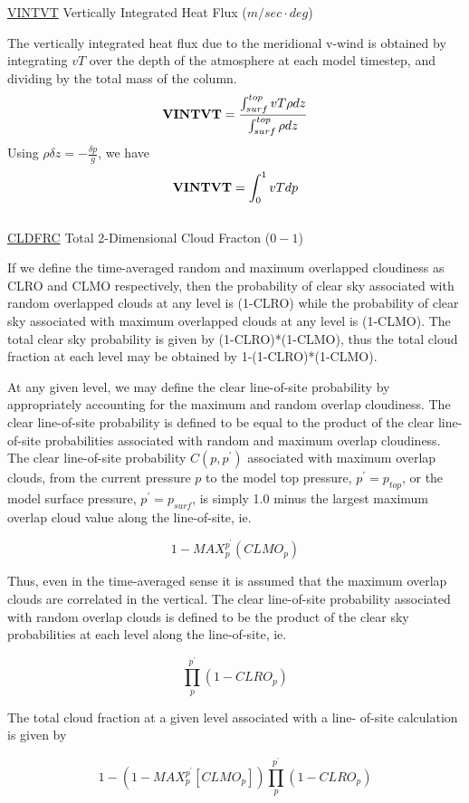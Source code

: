 \noindent
{ \underline {VINTVT} Vertically Integrated Heat Flux ($m/sec \cdot deg$) }

\noindent
The vertically integrated heat flux due to the meridional v-wind is obtained by integrating
$v T$ over the depth of the atmosphere at each model timestep, 
and dividing by the total mass of the column.
\[
{\bf VINTVT} = \frac{ \int_{surf}^{top} v T \rho dz  } { \int_{surf}^{top} \rho dz  }
\]
Using $\rho \delta z = -\frac{\delta p}{g} $, we have 
\[
{\bf VINTVT} = { \int_0^1 v T dp  }
\]
\\

\noindent
{ \underline {CLDFRC} Total 2-Dimensional Cloud Fracton ($0-1$) }

If we define the
time-averaged random and maximum overlapped cloudiness as CLRO and
CLMO respectively, then the probability of clear sky associated 
with random overlapped clouds at any level is (1-CLRO) while the probability of
clear sky associated with maximum overlapped clouds at any level is (1-CLMO). 
The total clear sky probability is given by (1-CLRO)*(1-CLMO), thus
the total cloud fraction at each  level may be obtained by 
1-(1-CLRO)*(1-CLMO).

At any given level, we may define the clear line-of-site probability by
appropriately accounting for the maximum and random overlap
cloudiness.  The clear line-of-site probability is defined to be
equal to the product of the clear line-of-site probabilities
associated with random and maximum overlap cloudiness.  The clear
line-of-site probability $C(p,p^{\prime})$ associated with maximum overlap clouds, 
from the current pressure $p$ 
to the model top pressure, $p^{\prime} = p_{top}$, or the model surface pressure, $p^{\prime} = p_{surf}$,
is simply 1.0 minus the largest maximum overlap cloud value along  the
line-of-site, ie.

$$1-MAX_p^{p^{\prime}} \left( CLMO_p \right)$$

Thus, even in the time-averaged sense it is assumed that the
maximum overlap clouds are correlated in the vertical.  The clear
line-of-site probability associated with random overlap clouds is
defined to be the product of the clear sky probabilities at each
level along the line-of-site, ie. 

$$\prod_{p}^{p^{\prime}} \left( 1-CLRO_p \right)$$

The total cloud fraction at a given level associated with a line-
of-site calculation is given by

$$1-\left( 1-MAX_p^{p^{\prime}} \left[ CLMO_p \right] \right)
    \prod_p^{p^{\prime}} \left( 1-CLRO_p \right)$$


